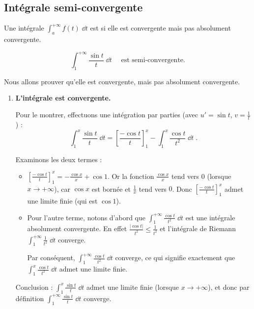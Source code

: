 \documentclass[class=report,crop=false]{standalone}
\begin{document}
\subsection{Intégrale semi-convergente}

\begin{definition}
Une intégrale $\int_a^{+\infty} f(t)\;\dd t$ est  si 
elle est convergente mais pas absolument convergente.
\end{definition}

\begin{exemple}
\label{ex:abel}
$$\int_1^{+\infty} \frac{\sin t }{t}\;\dd t \quad\text{ est semi-convergente.}$$

Nous allons prouver qu'elle est convergente, mais pas absolument convergente.
\begin{enumerate}

  
  \item \textbf{L'intégrale est convergente.}

  Pour le montrer, effectuons une intégration par parties (avec $u'=\sin t$, $v=\frac1t$) :
$$\int_1^x \frac{\sin t}{t}\;\dd t  = \left[\frac{-\cos t}{t}\right]_1^x
-  \int_1^x \frac{\cos t}{t^2}\;\dd t\;.$$

Examinons les deux termes :
  \begin{itemize}
    \item $\left[\frac{-\cos t}{t}\right]_1^x = -\frac{\cos x}{x}+\cos 1$.
    Or la fonction $\frac{\cos x}{x}$ tend vers $0$ (lorsque $x \to +\infty$), 
    car $\cos x$ est bornée et $\frac{1}{x}$ tend vers $0$.
    Donc $\left[\frac{-\cos t}{t}\right]_1^x$ admet une limite finie (qui est $\cos 1$). 
    
    \item Pour l'autre terme, notons d'abord que 
    $\int_1^{+\infty} \frac{\cos t}{t^2}\;\dd t$ est une intégrale absolument convergente.
    En effet $\frac{| \cos t |}{t^2} \le \frac{1}{t^2}$
    et l'intégrale de Riemann $\int_1^{+\infty} \frac{1}{t^2}\;\dd t$ converge.
    
    Par conséquent, $\int_1^{+\infty} \frac{\cos t}{t^2}\;\dd t$ converge, ce qui signifie exactement
    que  $\int_1^{x} \frac{\cos t}{t^2}\;\dd t$ admet une limite finie.    
  \end{itemize}

Conclusion : $\int_1^x \frac{\sin t}{t}\;\dd t$ admet une limite finie (lorsque $x\to+\infty$), et 
donc par définition $\int_1^{+\infty} \frac{\sin t}{t}\;\dd t$ converge.


\end{enumerate}
\end{exemple}
\end{document}
